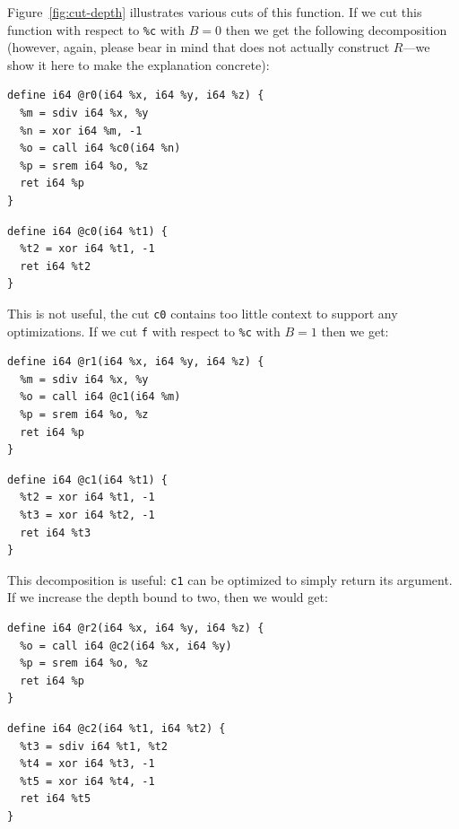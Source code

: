 Figure~\ref{fig:cut-depth} illustrates various cuts of this function.
%
If we cut this function with respect to \texttt{\%c} with $B = 0$ then
we get the following decomposition (however, again, please bear in
mind that \minotaur{} does not actually construct $R$---we show it here to
make the explanation concrete):

{\begin{quoting}
\begin{Verbatim}
define i64 @r0(i64 %x, i64 %y, i64 %z) {
  %m = sdiv i64 %x, %y
  %n = xor i64 %m, -1
  %o = call i64 %c0(i64 %n)
  %p = srem i64 %o, %z
  ret i64 %p
}
\end{Verbatim}
\end{quoting}}
{\begin{quoting}
\begin{Verbatim}
define i64 @c0(i64 %t1) {
  %t2 = xor i64 %t1, -1
  ret i64 %t2
}
\end{Verbatim}
\end{quoting}}

This is not useful, the cut \texttt{c0} contains too little context
to support any optimizations.
%
If we cut \texttt{f} with respect to \texttt{\%c} with $B = 1$ then we get:

{\begin{quoting}
\begin{Verbatim}
define i64 @r1(i64 %x, i64 %y, i64 %z) {
  %m = sdiv i64 %x, %y
  %o = call i64 @c1(i64 %m)
  %p = srem i64 %o, %z
  ret i64 %p
}
\end{Verbatim}
\end{quoting}}

{\begin{quoting}
\begin{Verbatim}
define i64 @c1(i64 %t1) {
  %t2 = xor i64 %t1, -1
  %t3 = xor i64 %t2, -1
  ret i64 %t3
}
\end{Verbatim}
\end{quoting}}


This decomposition is useful: \texttt{c1} can be optimized to simply
return its argument.
%
If we increase the depth bound to two, then we would get:


{\begin{quoting}
\begin{Verbatim}
define i64 @r2(i64 %x, i64 %y, i64 %z) {
  %o = call i64 @c2(i64 %x, i64 %y)
  %p = srem i64 %o, %z
  ret i64 %p
}
\end{Verbatim}
\end{quoting}}
{\begin{quoting}
\begin{Verbatim}
define i64 @c2(i64 %t1, i64 %t2) {
  %t3 = sdiv i64 %t1, %t2
  %t4 = xor i64 %t3, -1
  %t5 = xor i64 %t4, -1
  ret i64 %t5
}
\end{Verbatim}
\end{quoting}}


